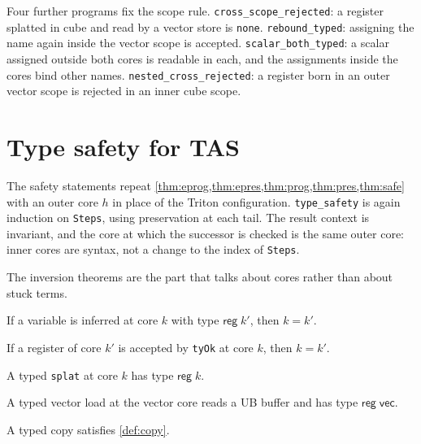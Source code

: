 \documentclass[a4paper,UKenglish,anonymous,cleveref,autoref]{lipics-v2021}
\begin{document}
Four further programs fix the scope rule.
\texttt{cross\_scope\_rejected}: a register splatted in cube and read by a vector store is \texttt{none}.
\texttt{rebound\_typed}: assigning the name again inside the vector scope is accepted.
\texttt{scalar\_both\_typed}: a scalar assigned outside both cores is readable in each, and the assignments inside the cores bind other names.
\texttt{nested\_cross\_rejected}: a register born in an outer vector scope is rejected in an inner cube scope.

\section{Type safety for TAS}
\label{sec:tas-safe}

The safety statements repeat \cref{thm:eprog,thm:epres,thm:prog,thm:pres,thm:safe} with an outer core \(h\) in place of the Triton configuration.
\texttt{type\_safety} is again induction on \texttt{Steps}, using preservation at each tail.
The result context is invariant, and the core at which the successor is checked is the same outer core: inner cores are syntax, not a change to the index of \texttt{Steps}.

The inversion theorems are the part that talks about cores rather than about stuck terms.

\begin{theorem}
If a variable is inferred at core \(k\) with type \(\mathsf{reg}\;k'\), then \(k = k'\).
\end{theorem}

\begin{theorem}
If a register of core \(k'\) is accepted by \texttt{tyOk} at core \(k\), then \(k = k'\).
\end{theorem}

\begin{theorem}
A typed \texttt{splat} at core \(k\) has type \(\mathsf{reg}\;k\).
\end{theorem}

\begin{theorem}
A typed vector load at the vector core reads a UB buffer and has type \(\mathsf{reg}\;\mathsf{vec}\).
\end{theorem}

\begin{theorem}
A typed copy satisfies \cref{def:copy}.
\end{theorem}
\end{document}

